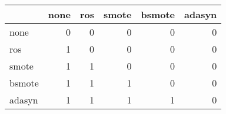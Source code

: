\begin{tabular}{lrrrrr}
\hline
        &   none &   ros &   smote &   bsmote &   adasyn \\
\hline
 none   &      0 &     0 &       0 &        0 &        0 \\
 ros    &      1 &     0 &       0 &        0 &        0 \\
 smote  &      1 &     1 &       0 &        0 &        0 \\
 bsmote &      1 &     1 &       1 &        0 &        0 \\
 adasyn &      1 &     1 &       1 &        1 &        0 \\
\hline
\end{tabular}